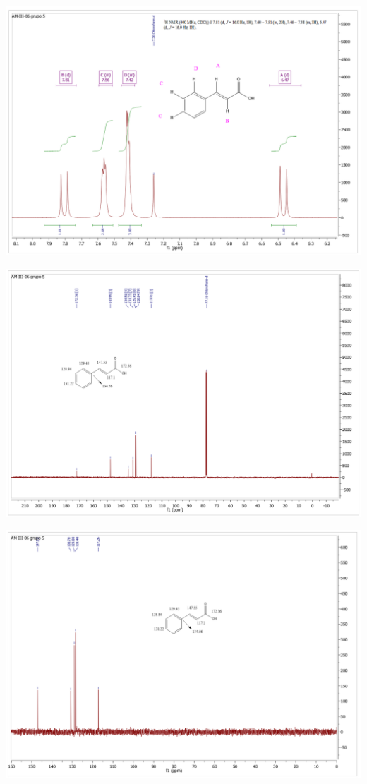\documentclass[fleqn,11pt]{SelfArx}
\begin{document}
{
	\begin{minipage}{0.9\textheight}
		\centering
		\includegraphics[height=0.65\textheight]{RMN/H2.png}
		\label{HRMN2}
	\end{minipage}
}

{
	\begin{minipage}{0.9\textheight}
		\centering
		\includegraphics[height=0.65\textheight]{RMN/C.png}
		\label{CRMN}
	\end{minipage}
}

{
	\begin{minipage}{0.9\textheight}
		\centering
		\includegraphics[height=0.65\textheight]{RMN/DEPT.png}
		\label{DEPT}
	\end{minipage}
}
\end{document}
